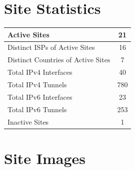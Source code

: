 



\chapter{Site Statistics}
\label{cha:Site-Statistics}


\begin{small}
\begin{center}
\begin{longtable}{|c|c|}
 \hline
 \multicolumn{1}{|l|}{Active Sites} & 21 \\ \hline
 \multicolumn{1}{|l|}{Distinct ISPs of Active Sites} & 16 \\ \hline
 \multicolumn{1}{|l|}{Distinct Countries of Active Sites} & 7 \\ \hline
 \multicolumn{1}{|l|}{Total IPv4 Interfaces} & 40 \\ \hline
 \multicolumn{1}{|l|}{Total IPv4 Tunnels} & 780 \\ \hline
 \multicolumn{1}{|l|}{Total IPv6 Interfaces} & 23 \\ \hline
 \multicolumn{1}{|l|}{Total IPv6 Tunnels} & 253 \\ \hline
 \multicolumn{1}{|l|}{Inactive Sites} & 1 \\ \hline
\end{longtable}
\end{center}
\end{small}




\chapter{Site Images}
\label{cha:Images}


